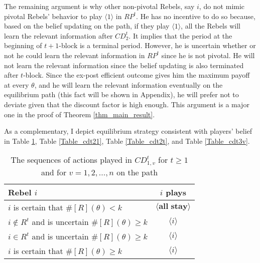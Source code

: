 \documentclass[12pt,letter]{article}
\theoremstyle{definition}
\theoremstyle{remark}
\theoremstyle{claim}
\begin{document}
The remaining argument is why other non-pivotal Rebels, say $i$, do not mimic pivotal Rebels' behavior to play $\langle 1 \rangle$ in $RP^t$. He has no incentive to do so because, based on the belief updating on the path, if they play $\langle 1 \rangle$, all the Rebels will learn the relevant information after $CD^t_2$. It implies that the period at the beginning of $t+1$-block is a terminal period. However, he is uncertain whether or not he could learn the relevant information in $RP^t$ since he is not pivotal. He will not learn the relevant information since the belief updating is also terminated after $t$-block. Since the ex-post efficient outcome gives him the maximum payoff at every $\theta$, and he will learn the relevant information eventually on the equilibrium path (this fact will be shown in Appendix), he will prefer not to deviate given that the discount factor is high enough. This argument is a major one in the proof of Theorem \ref{thm_main_result}.

As a complementary, I depict equilibrium strategy consistent with players' belief in Table \ref{Table_cdt1v}, Table \ref{Table_cdt21}, Table \ref{Table_cdt2t}, and Table \ref{Table_cdt3v}.

\begin{table}[!htbp]
\caption{The sequences of actions played in $CD^t_{1,v}$ for $t\geq 1$ and for $v=1,2,...,n$ on the path}
\label{Table_cdt1v}
\begin{center}
\begin{tabular}{l c}
Rebel $i$ 	 	&  	$i$ plays		 \\
\hline
\hline
$i$ is certain that $\#[R](\theta)<k$ 	& 	$\langle \textbf{all stay} \rangle$	\\
$i\notin R^{t}$ and is uncertain $\#[R](\theta)\geq k$	& 	$\langle i \rangle$	\\
$i\in R^{t}$ and is uncertain $\#[R](\theta)\geq k$ &  $\langle i \rangle$  \\
$i$ is certain that $\#[R](\theta)\geq k$ &  $\langle i \rangle$  \\
\hline
\end{tabular}
\end{center}
\end{table}
\end{document}
